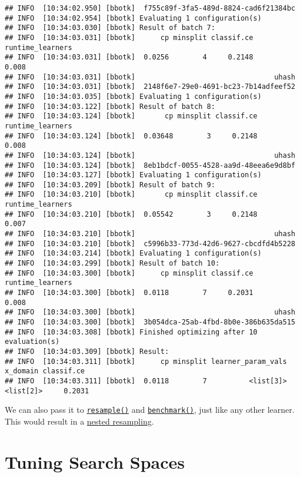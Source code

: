 \documentclass[
]{scrbook}
\begin{document}
\begin{verbatim}
## INFO  [10:34:02.950] [bbotk]  f755c89f-3fa5-489d-8824-cad6f21384bc 
## INFO  [10:34:02.954] [bbotk] Evaluating 1 configuration(s) 
## INFO  [10:34:03.030] [bbotk] Result of batch 7: 
## INFO  [10:34:03.031] [bbotk]      cp minsplit classif.ce runtime_learners 
## INFO  [10:34:03.031] [bbotk]  0.0256        4     0.2148            0.008 
## INFO  [10:34:03.031] [bbotk]                                 uhash 
## INFO  [10:34:03.031] [bbotk]  2148f6e7-29e0-4691-bc23-7b14adfeef52 
## INFO  [10:34:03.035] [bbotk] Evaluating 1 configuration(s) 
## INFO  [10:34:03.122] [bbotk] Result of batch 8: 
## INFO  [10:34:03.124] [bbotk]       cp minsplit classif.ce runtime_learners 
## INFO  [10:34:03.124] [bbotk]  0.03648        3     0.2148            0.008 
## INFO  [10:34:03.124] [bbotk]                                 uhash 
## INFO  [10:34:03.124] [bbotk]  8eb1bdcf-0055-4528-aa9d-48eea6e9d8bf 
## INFO  [10:34:03.127] [bbotk] Evaluating 1 configuration(s) 
## INFO  [10:34:03.209] [bbotk] Result of batch 9: 
## INFO  [10:34:03.210] [bbotk]       cp minsplit classif.ce runtime_learners 
## INFO  [10:34:03.210] [bbotk]  0.05542        3     0.2148            0.007 
## INFO  [10:34:03.210] [bbotk]                                 uhash 
## INFO  [10:34:03.210] [bbotk]  c5996b33-773d-42d6-9627-cbcdfd4b5228 
## INFO  [10:34:03.214] [bbotk] Evaluating 1 configuration(s) 
## INFO  [10:34:03.299] [bbotk] Result of batch 10: 
## INFO  [10:34:03.300] [bbotk]      cp minsplit classif.ce runtime_learners 
## INFO  [10:34:03.300] [bbotk]  0.0118        7     0.2031            0.008 
## INFO  [10:34:03.300] [bbotk]                                 uhash 
## INFO  [10:34:03.300] [bbotk]  3b054dca-25ab-4fbd-8b0e-386b635da515 
## INFO  [10:34:03.308] [bbotk] Finished optimizing after 10 evaluation(s) 
## INFO  [10:34:03.309] [bbotk] Result: 
## INFO  [10:34:03.311] [bbotk]      cp minsplit learner_param_vals  x_domain classif.ce 
## INFO  [10:34:03.311] [bbotk]  0.0118        7          <list[3]> <list[2]>     0.2031
\end{verbatim}

We can also pass it to \href{https://mlr3.mlr-org.com/reference/resample.html}{\texttt{resample()}} and \href{https://mlr3.mlr-org.com/reference/benchmark.html}{\texttt{benchmark()}}, just like any other learner. This would result in a \protect\hyperlink{nested-resampling}{nested resampling}.

\hypertarget{searchspace}{%
\section{Tuning Search Spaces}\label{searchspace}}
\end{document}
